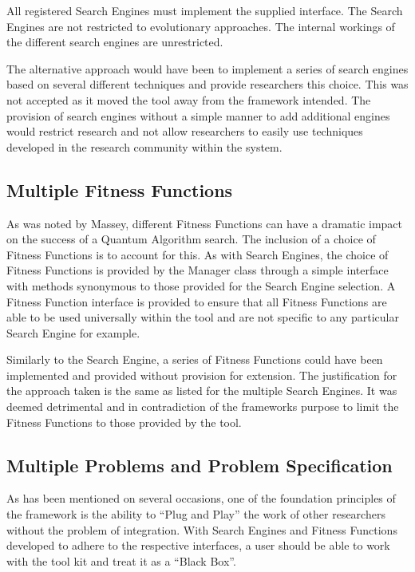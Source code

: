 All registered Search Engines must implement the supplied interface.
The Search Engines are not restricted to evolutionary approaches.
The internal workings of the different search engines are unrestricted.

The alternative approach would have been to implement a series of search engines based on several different techniques and provide researchers this choice.
This was not accepted as it moved the tool away from the framework intended.
The provision of search engines without a simple manner to add additional engines would restrict research and not allow researchers to easily use techniques developed in the research community within the system.

\subsection{Multiple Fitness Functions}
\label{sec:mulsuitmeas}
As was noted by Massey\cite{masseythesis}, different Fitness Functions can have a dramatic impact on the success of a Quantum Algorithm search.
The inclusion of a choice of Fitness Functions is to account for this.
As with Search Engines, the choice of Fitness Functions is provided by the Manager class through a simple interface with methods synonymous to those provided for the Search Engine selection.
A Fitness Function interface is provided to ensure that all Fitness Functions are able to be used universally within the tool and are not specific to any particular Search Engine for example.

Similarly to the Search Engine, a series of Fitness Functions could have been implemented and provided without provision for extension.
The justification for the approach taken is the same as listed for the multiple Search Engines.
It was deemed detrimental and in contradiction of the frameworks purpose to limit the Fitness Functions to those provided by the tool.


\subsection{Multiple Problems and Problem Specification}
\label{sec:problemman}
As has been mentioned on several occasions, one of the foundation principles of the framework is the ability to ``Plug and Play'' the work of other researchers without the problem of integration.
With Search Engines and Fitness Functions developed to adhere to the respective interfaces, a user should be able to work with the tool kit and treat it as a ``Black Box''.

